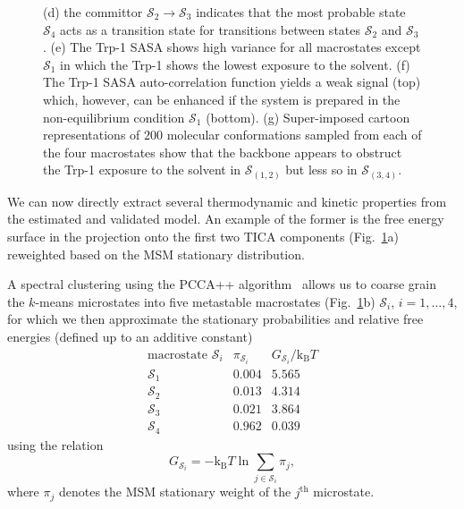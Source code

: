 \documentclass[9pt,tutorial]{livecoms}
\begin{document}
\begin{figure}
{(d) the committor $\mathcal{S}_2\to\mathcal{S}_3$ indicates that the most probable state $\mathcal{S}_4$ acts as a transition state for transitions between states $\mathcal{S}_2$ and $\mathcal{S}_3$.
(e) The Trp-1 SASA shows high variance for all macrostates except $\mathcal{S}_1$ in which the Trp-1 shows the lowest exposure to the solvent.
(f) The Trp-1 SASA auto-correlation function yields a weak signal (top) which, however, can be enhanced if the system is prepared in the non-equilibrium condition $\mathcal{S}_1$ (bottom).
(g) Super-imposed cartoon representations of $200$ molecular conformations sampled from each of the four macrostates show that the backbone appears to obstruct the Trp-1 exposure to the solvent in $\mathcal{S}_{(1,2)}$ but less so in $\mathcal{S}_{(3,4)}$.}
\label{fig:msm-analysis}
\end{figure}

We can now directly extract several thermodynamic and kinetic properties from the estimated and validated model.
An example of the former is the free energy surface in the projection onto the first two TICA components (Fig.~\ref{fig:msm-analysis}a) reweighted based on the MSM stationary distribution.

A spectral clustering using the PCCA++ algorithm~\cite{pcca++} allows us to coarse grain the $k$-means microstates into five metastable macrostates (Fig.~\ref{fig:msm-analysis}b) $\mathcal{S}_i$, $i=1,\dots,4$, for which we then approximate the stationary probabilities and relative free energies (defined up to an additive constant)
\[ \begin{array}{ccc}
\textrm{macrostate } \mathcal{S}_i & \pi_{\mathcal{S}_i} & G_{\mathcal{S}_i} / \textrm{k}_\textrm{B} T \\
\hline
\mathcal{S}_1 & 0.004 & 5.565 \\
\mathcal{S}_2 & 0.013 & 4.314 \\
\mathcal{S}_3 & 0.021 & 3.864 \\
\mathcal{S}_4 & 0.962 & 0.039
\end{array}\]
using the relation
\begin{equation}
\label{eq:fe}
G_{\mathcal{S}_i} = - \textrm{k}_\textrm{B} T \ln \sum\limits_{j\in \mathcal{S}_i} \pi_j,
\end{equation}
where $\pi_j$ denotes the MSM stationary weight of the $j^\textrm{th}$ microstate.
\end{document}
